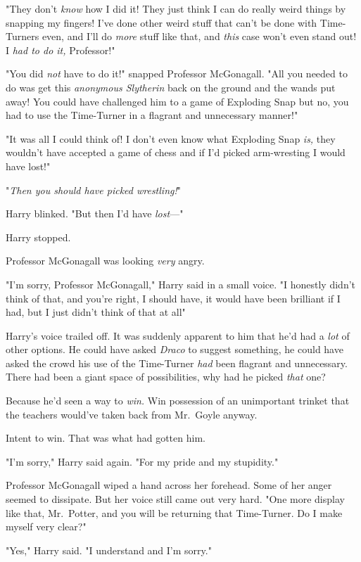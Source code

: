 "They don't \emph{know} how I did it! They just think I can do really weird
things by snapping my fingers! I've done other weird stuff that can't be done
with Time-Turners even, and I'll do \emph{more} stuff like that, and
\emph{this} case won't even stand out! I \emph{had to do it,} Professor!"

"You did \emph{not} have to do it!" snapped Professor McGonagall. "All you
needed to do was get this \emph{anonymous Slytherin} back on the ground and the
wands put away! You could have challenged him to a game of Exploding Snap but
no, you had to use the Time-Turner in a flagrant and unnecessary manner!"

"It was all I could think of! I don't even know what Exploding Snap \emph{is,}
they wouldn't have accepted a game of chess and if I'd picked arm-wresting I
would have lost!"

"\emph{Then you should have picked wrestling!}"

Harry blinked. "But then I'd have \emph{lost}\mbox{---}"

Harry stopped.

Professor McGonagall was looking \emph{very} angry.

"I'm sorry, Professor McGonagall," Harry said in a small voice. "I honestly
didn't think of that, and you're right, I should have, it would have been
brilliant if I had, but I just didn't think of that at all{\el}"

Harry's voice trailed off. It was suddenly apparent to him that he'd had a
\emph{lot} of other options. He could have asked \emph{Draco} to suggest
something, he could have asked the crowd{\el} his use of the Time-Turner
\emph{had} been flagrant and unnecessary. There had been a giant space of
possibilities, why had he picked \emph{that} one?

Because he'd seen a way to \emph{win.} Win possession of an unimportant trinket
that the teachers would've taken back from Mr.~Goyle anyway.

Intent to win. That was what had gotten him.

"I'm sorry," Harry said again. "For my pride and my stupidity."

Professor McGonagall wiped a hand across her forehead. Some of her anger seemed
to dissipate. But her voice still came out very hard. "One more display like
that, Mr.~Potter, and you will be returning that Time-Turner. Do I make myself
very clear?"

"Yes," Harry said. "I understand and I'm sorry."

